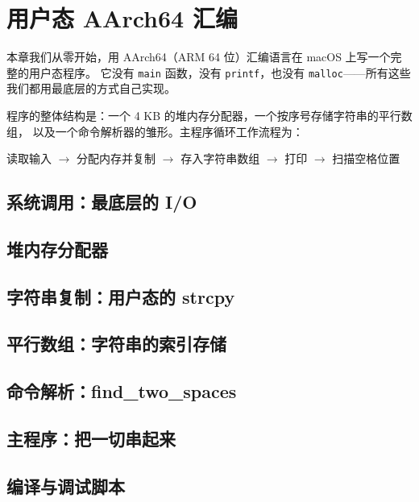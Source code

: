 \chapter{用户态 AArch64 汇编}

本章我们从零开始，用 AArch64（ARM 64 位）汇编语言在 macOS 上写一个完整的用户态程序。
它没有 \texttt{main} 函数，没有 \texttt{printf}，也没有 \texttt{malloc}——所有这些
我们都用最底层的方式自己实现。

程序的整体结构是：一个 4 KB 的堆内存分配器，一个按序号存储字符串的平行数组，
以及一个命令解析器的雏形。主程序循环工作流程为：
\begin{center}
    读取输入 \(\rightarrow\) 分配内存并复制 \(\rightarrow\)
    存入字符串数组 \(\rightarrow\) 打印 \(\rightarrow\) 扫描空格位置
\end{center}

\section{系统调用：最底层的 I/O}


\section{堆内存分配器}


\section{字符串复制：用户态的 strcpy}


\section{平行数组：字符串的索引存储}


\section{命令解析：find\_two\_spaces}


\section{主程序：把一切串起来}


\section{编译与调试脚本}

